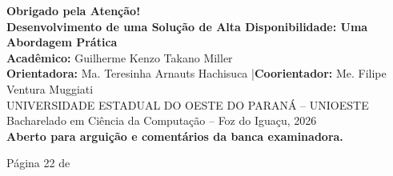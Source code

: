 \documentclass[aspectratio=169,10pt]{beamer}
\begin{document}
\begin{frame}[plain]
  \begin{center}
    \vspace{2.5em}
    {\Huge \textbf{\textcolor{UnioesteBlue}{Obrigado pela Atenção!}}}\\[1.5em]
    {\large \textbf{Desenvolvimento de uma Solução de Alta Disponibilidade: Uma Abordagem Prática}}\\[1.5em]
    \textbf{Acadêmico:} Guilherme Kenzo Takano Miller\\[0.5ex]
    \textbf{Orientadora:} Ma. Teresinha Arnauts Hachisuca \quad|\quad \textbf{Coorientador:} Me. Filipe Ventura Muggiati\\[1.5em]
    \small \textcolor{UnioesteNavy}{UNIVERSIDADE ESTADUAL DO OESTE DO PARANÁ -- UNIOESTE}\\
    \small Bacharelado em Ciência da Computação -- Foz do Iguaçu, 2026\\[1.8em]
    \large \textcolor{SuccessGreen}{\textbf{Aberto para arguição e comentários da banca examinadora.}}
  \end{center}
  \vspace{1.5em}
  \begin{flushright}
    \scriptsize \textcolor{TextMuted}{Página 22 de \inserttotalframenumber}
  \end{flushright}
\end{frame}
\end{document}
